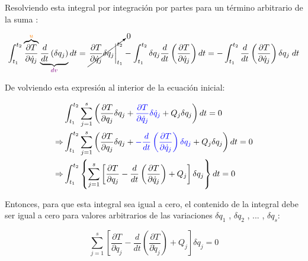 \documentclass[/home/hernan/Documentos/Apuntes_mecanica_teorica/main.tex]{subfiles}
\begin{document}
    Resolviendo esta integral por integración por partes para un término arbitrario de la suma :

    \begin{align*}
        \int_{t_1}^{t_2} \overbrace{\frac{\partial T}{\partial \dot{q}_{j}}}^{\textcolor{orange}{u}} \underbrace{\frac{d}{d t} \left(\delta  q_{j}\right)}_{\textcolor{violet}{dv} } dt & = \cancelto{0}{\left.  \frac{\partial T}{\partial \dot{q}_{j}} \delta  q_{j}  \right|_{t_1}^{t_2}} - \int_{t_1}^{t_2}  \delta  q_{j} \frac{d}{d t} \left(\frac{\partial T}{\partial \dot{q}_{j}} \right) dt =  - \int_{t_1}^{t_2}  \frac{d}{d t} \left(\frac{\partial T}{\partial \dot{q}_{j}} \right)  \delta  q_{j}  \; dt \\ 
    \end{align*}

    De volviendo esta expresión al interior de la ecuación inicial:

    \begin{align*}
        & \int_{t_1}^{t_2} \sum_{j=1}^{s}  \left(\frac{\partial T}{\partial q_{j}} \delta q_{j} + \textcolor{blue}{\frac{\partial T}{\partial \dot{q}_{j}} \delta \dot{q}_{j}}   + Q_{j} \delta q_{j} \right) dt = 0 \\ 
        \Rightarrow  & \int_{t_1}^{t_2} \sum_{j=1}^{s}  \left(\frac{\partial T}{\partial q_{j}} \delta q_{j} + \textcolor{blue}{- \frac{d}{d t} \left(\frac{\partial T}{\partial \dot{q}_{j}} \right)  \delta  q_{j}}   + Q_{j} \delta q_{j} \right) dt = 0 \\ 
        \Rightarrow  & \int_{t_1}^{t_2} \left \{ \sum_{j=1}^{s}  \left[\frac{\partial T}{\partial q_{j}}  - \frac{d}{d t} \left(\frac{\partial T}{\partial \dot{q}_{j}} \right)     + Q_{j}  \right] \delta q_{j} \right\}  dt = 0
    \end{align*}

    Entonces, para que esta integral sea igual a cero, el contenido de la integral debe ser igual a cero para valores arbitrarios de las variaciones $\delta q_{1}$ , $\delta q_{2}$ , ... , $\delta q_{s}$: 

    \begin{equation*}
        \sum_{j=1}^{s}  \left[\frac{\partial T}{\partial q_{j}}  - \frac{d}{d t} \left(\frac{\partial T}{\partial \dot{q}_{j}} \right)     + Q_{j}  \right] \delta q_{j} = 0
    \end{equation*}
\end{document}
